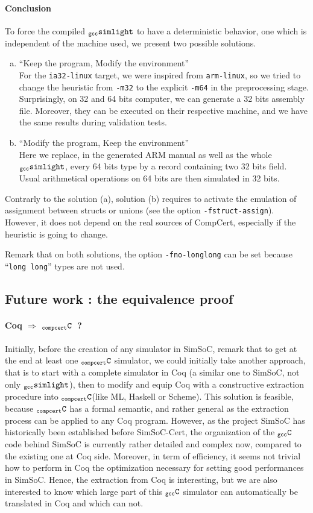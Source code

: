\documentclass[a4paper, 11pt]{article}
\newcommand{\gccSL}{$_{\tt gcc}{\tt simlight}$\xspace}
\newcommand{\C}{$_{\tt compcert}{\tt C}$\xspace}
\newcommand{\gccC}{$_{\tt gcc}{\tt C}$\xspace}
\newcommand{\simsoc}{SimSoC\xspace}
\newcommand{\SScert}{SimSoC-Cert\xspace}
\begin{document}
\paragraph{Conclusion}
To force the compiled \gccSL to have a deterministic behavior, one which is independent of the machine used, we present two possible solutions.
\begin{enumerate}[(a)]
\item ``Keep the program, Modify the environment''\\
For the \verb|ia32-linux| target, we were inspired from \verb|arm-linux|, so we tried to change the heuristic from \verb|-m32| to the explicit \verb|-m64| in the preprocessing stage. Surprisingly, on 32 and 64 bits computer, we can generate a 32 bits assembly file. Moreover, they can be executed on their respective machine, and we have the same results during validation tests.

\item ``Modify the program, Keep the environment''\\
Here we replace, in the generated ARM manual as well as the whole \gccSL, every 64 bits type by a record containing two 32 bits field. Usual arithmetical operations on 64 bits are then simulated in 32 bits. 
\end{enumerate}
Contrarly to the solution (a), solution (b) requires to activate the emulation of assignment between structs or unions (see the option \verb|-fstruct-assign|). However, it does not depend on the real sources of CompCert, especially if the heuristic is going to change. 

Remark that on both solutions, the option \verb|-fno-longlong| can be set because ``\verb|long long|'' types are not used.

\subsection{Future work : the equivalence proof}
\paragraph{Coq $\Longrightarrow$ \C~?}
Initially, before the creation of any simulator in \simsoc, remark that to get at the end at least one \C simulator, we could initially take another approach, that is to start with a complete simulator in Coq (a similar one to \simsoc, not only \gccSL), then to modify and equip Coq with a constructive extraction procedure into \C (like ML, Haskell or Scheme). This solution is feasible, because \C has a formal semantic, and rather general as the extraction process can be applied to any Coq program. However, as the project \simsoc has historically been established before \SScert, the organization of the \gccC code behind \simsoc is currently rather detailed and complex now, compared to the existing one at Coq side. Moreover, in term of efficiency, it seems not trivial how to perform in Coq the optimization necessary for setting good performances in SimSoC. Hence, the extraction from Coq is interesting, but we are also interested to know which large part of this \gccC simulator can automatically be translated in Coq and which can not.
\end{document}
